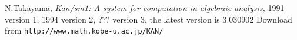
\begin{thebibliography}{ }

\bibitem[kan]
	N.Takayama,
	{\em Kan/sm1: A system for computation in
	algebraic analysis,} 1991 version 1,
        1994 version 2, ??? version 3, the latest version is 3.030902
        Download from {\tt \small http://www.math.kobe-u.ac.jp/KAN/}

\end{thebibliography}

